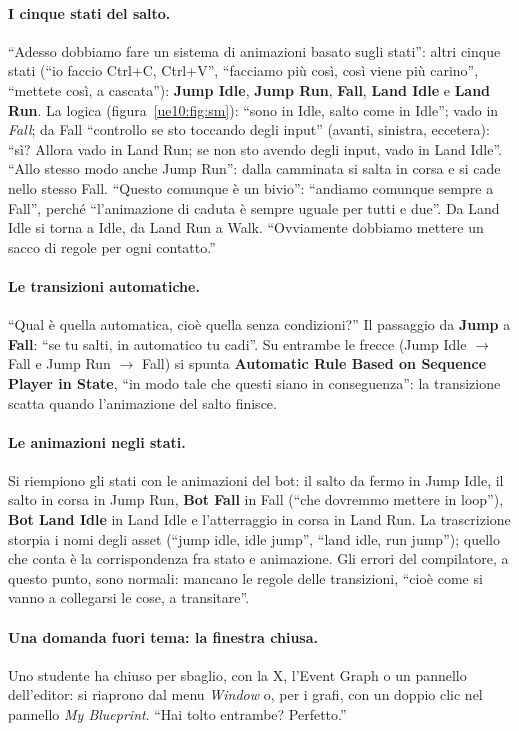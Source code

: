 \paragraph{I cinque stati del salto.} ``Adesso dobbiamo fare un sistema di animazioni
basato sugli stati'': altri cinque stati (``io faccio Ctrl+C, Ctrl+V'', ``facciamo più
così, così viene più carino'', ``mettete così, a cascata''):
\textbf{Jump Idle}, \textbf{Jump Run}, \textbf{Fall}, \textbf{Land Idle} e \textbf{Land
Run}. La logica (figura~\ref{ue10:fig:sm}): ``sono in Idle, salto come in Idle''; vado in
\emph{Fall}; da Fall ``controllo se sto toccando degli input'' (avanti, sinistra, eccetera):
``sì? Allora vado in Land Run; se non sto avendo degli input, vado in Land Idle''. ``Allo
stesso modo anche Jump Run'': dalla camminata si salta in corsa e si cade nello stesso
Fall. ``Questo comunque è un bivio'': ``andiamo comunque sempre a Fall'', perché
``l'animazione di caduta è sempre uguale per tutti e due''. Da Land Idle si torna a Idle,
da Land Run a Walk. ``Ovviamente dobbiamo mettere un sacco di regole per ogni contatto.''

\paragraph{Le transizioni automatiche.} ``Qual è quella automatica, cioè quella senza
condizioni?'' Il passaggio da \textbf{Jump} a \textbf{Fall}: ``se tu salti, in automatico
tu cadi''. Su entrambe le frecce (Jump Idle $\rightarrow$ Fall e Jump Run $\rightarrow$
Fall) si spunta \textbf{Automatic Rule Based on Sequence Player in State}, ``in modo tale
che questi siano in conseguenza'': la transizione scatta quando l'animazione del salto
finisce.

\paragraph{Le animazioni negli stati.} Si riempiono gli stati con le animazioni del bot:
il salto da fermo in Jump Idle, il salto in corsa in Jump Run, \textbf{Bot Fall} in Fall
(``che dovremmo mettere in loop''), \textbf{Bot Land Idle} in Land Idle e l'atterraggio in
corsa in Land Run. La trascrizione storpia i nomi degli asset (``jump idle, idle jump'',
``land idle, run jump''); quello che conta è la corrispondenza fra stato e animazione. Gli
errori del compilatore, a questo punto, sono normali: mancano le regole delle transizioni,
``cioè come si vanno a collegarsi le cose, a transitare''.

\paragraph{Una domanda fuori tema: la finestra chiusa.} Uno studente ha chiuso per
sbaglio, con la X, l'Event Graph o un pannello dell'editor: si riaprono dal menu
\emph{Window} o, per i grafi, con un doppio clic nel pannello \emph{My Blueprint}. ``Hai
tolto entrambe? Perfetto.''

